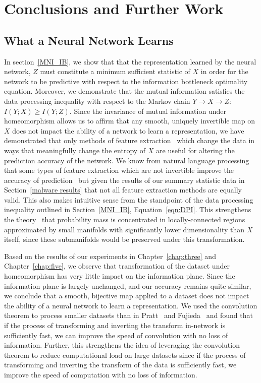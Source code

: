 \chapter{Conclusions and Further Work}
\label{chap:conclusion}

\section{What a Neural Network Learns}
In section~\ref{MNI_IB}, we show that that the representation learned by the neural network, $Z$ must constitute a minimum sufficient statistic of $X$ in order for the network to be predictive with respect to the information bottleneck optimality equation. 
Moreover, we demonstrate that the mutual information satisfies the data processing inequality with respect to the Markov chain $Y \to X \to Z$: $I(Y; X) \geq I(Y; Z)$.
Since the invariance of mutual information under homeomorphism allows us to affirm that any smooth, uniquely invertible map on $X$ does not impact the ability of a network to learn a representation, we have demonstrated that only methods of feature extraction~\cite{goodfellow2016deep} which change the data in ways that meaningfully change the entropy of $X$ are useful for altering the prediction accuracy of the network.
We know from natural language processing that some types of feature extraction which are not invertible improve the accuracy of prediction~\cite{goodfellow2016deep} but given the results of our summary statistic data in Section~\ref{malware results} that not all feature extraction methods are equally valid.
This also makes intuitive sense from the standpoint of the data processing inequality outlined in Section~\ref{MNI_IB}, Equation~\ref{eqn:DPI}.
This strengthens the theory~\cite{goodfellow2014explaining} that probability mass is concentrated in locally-connected regions approximated by small manifolds with significantly lower dimensionality than $X$ itself, since these submanifolds would be preserved under this transformation.

Based on the results of our experiments in Chapter~\ref{chap:three} and Chapter~\ref{chap:five}, we observe that transformation of the dataset under homeomorphism has very little impact on the information plane.
Since the information plane is largely unchanged, and our accuracy remains quite similar, we conclude that a smooth, bijective map applied to a dataset does not impact the ability of a neural network to learn a representation.
We used the convolution theorem to process smaller datasets than in Pratt~\cite{pratt2017fcnn} and Fujieda~\cite{fujieda2017wavelet} and found that if the process of transforming and inverting the transform in-network is sufficiently fast, we can improve the speed of convolution with no loss of information. 
Further, this strengthens the idea of leveraging the convolution theorem to reduce computational load on large datasets since if the process of transforming and inverting the transform of the data is sufficiently fast, we improve the speed of computation with no loss of information.

